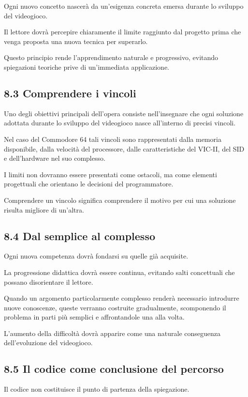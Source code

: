 \documentclass{article}
\begin{document}
Ogni nuovo concetto nascerà da un'esigenza concreta emersa durante lo sviluppo del videogioco.

Il lettore dovrà percepire chiaramente il limite raggiunto dal progetto prima che venga proposta una nuova tecnica per
superarlo.

Questo principio rende l'apprendimento naturale e progressivo, evitando spiegazioni teoriche prive di un'immediata
applicazione.

\subsection{8.3 Comprendere i vincoli}
Uno degli obiettivi principali dell'opera consiste nell'insegnare che ogni soluzione adottata durante lo sviluppo del
videogioco nasce all'interno di precisi vincoli.

Nel caso del Commodore 64 tali vincoli sono rappresentati dalla memoria disponibile, dalla velocità del processore,
dalle caratteristiche del VIC-II, del SID e dell'hardware nel suo complesso.

I limiti non dovranno essere presentati come ostacoli, ma come elementi progettuali che orientano le decisioni del
programmatore.

Comprendere un vincolo significa comprendere il motivo per cui una soluzione risulta migliore di un'altra.

\subsection{8.4 Dal semplice al complesso}
Ogni nuova competenza dovrà fondarsi su quelle già acquisite.

La progressione didattica dovrà essere continua, evitando salti concettuali che possano disorientare il lettore.

Quando un argomento particolarmente complesso renderà necessario introdurre nuove conoscenze, queste verranno costruite
gradualmente, scomponendo il problema in parti più semplici e affrontandole una alla volta.

L'aumento della difficoltà dovrà apparire come una naturale conseguenza dell'evoluzione del videogioco.

\subsection{8.5 Il codice come conclusione del percorso}
Il codice non costituisce il punto di partenza della spiegazione.
\end{document}
